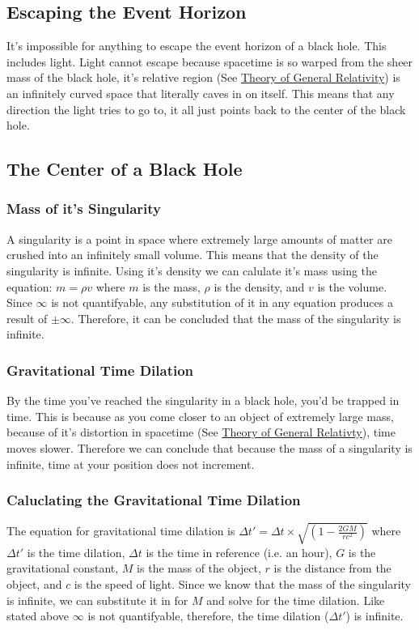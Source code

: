 \documentclass{article}
\begin{document}
\subsection{Escaping the Event Horizon}
It's impossible for anything to escape the event horizon of a black hole. This includes light. Light cannot escape because spacetime is so warped from the sheer mass of the black hole, it's relative region (See \hyperref[sec:generalrelativity]{Theory of General Relativity}) is an infinitely curved space that literally caves in on itself. This means that any direction the light tries to go to, it all just points back to the center of the black hole.

\subsection{The Center of a Black Hole}
\subsubsection{Mass of it's Singularity}
A singularity is a point in space where extremely large amounts of matter are crushed into an infinitely small volume. This means that the density of the singularity is infinite. Using it's density we can calulate it's mass using the equation: $m = \rho v$ where $m$ is the mass, $\rho$ is the density, and $v$ is the volume. Since $\infty$ is not quantifyable, any substitution of it in any equation produces a result of $\pm \infty$. Therefore, it can be concluded that the mass of the singularity is infinite.

\subsubsection{Gravitational Time Dilation}
By the time you've reached the singularity in a black hole, you'd be trapped in time. This is because as you come closer to an object of extremely large mass, because of it's distortion in spacetime (See \hyperref[sec:generalrelativity]{Theory of General Relativty}), time moves slower. Therefore we can conclude that because the mass of a singularity is infinite, time at your position does not increment.

\subsubsection{Caluclating the Gravitational Time Dilation}
The equation for gravitational time dilation is $\Delta t\prime = \Delta t\times\sqrt{(1-\frac{2GM}{rc^2})}$ where $\Delta t\prime$ is the time dilation, $\Delta t$ is the time in reference (i.e. an hour), $G$ is the gravitational constant, $M$ is the mass of the object, $r$ is the distance from the object, and $c$ is the speed of light. Since we know that the mass of the singularity is infinite, we can substitute it in for $M$ and solve for the time dilation. Like stated above $\infty$ is not quantifyable, therefore, the time dilation ($\Delta t\prime$) is infinite.
\end{document}
